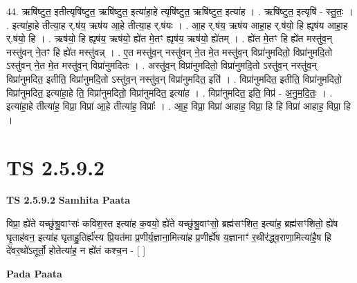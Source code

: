 \documentclass[17pt]{extarticle}
\begin{document}
44. ऋषि॑ष्टुत॒ इतीत्यृषि॑ष्टुत॒ ऋषि॑ष्टुत॒ इत्या॑हा॒हे त्यृषि॑ष्टुत॒ ऋषि॑ष्टुत॒ इत्या॑ह । . ऋषि॑ष्टुत॒ इत्यृषि॑ - स्तु॒तः॒ । . इत्या॑हा॒हे तीत्या॒ह र्.ष॑य॒ ऋष॑य आ॒हे तीत्या॒ह र्.ष॑यः । . आ॒ह र्.ष॑य॒ ऋष॑य आहा॒ह र्.ष॑यो॒ हि ह्यृष॑य आहा॒ह र्.ष॑यो॒ हि । . ऋष॑यो॒ हि ह्यृष॑य॒ ऋष॑यो॒ ह्ये॑त मे॒तꣳ ह्यृष॑य॒ ऋष॑यो॒ ह्ये॑तम् । . ह्ये॑त मे॒तꣳ हि ह्ये॑त मस्तु॑व॒न् नस्तु॑वन् ने॒तꣳ हि ह्ये॑त मस्तु॑वन्न् । . ए॒त मस्तु॑व॒न् नस्तु॑वन् ने॒त मे॒त मस्तु॑व॒न् विप्रा॑नुमदितो॒ विप्रा॑नुमदि॒तो ऽस्तु॑वन् ने॒त मे॒त मस्तु॑व॒न् विप्रा॑नुमदितः । . अस्तु॑व॒न् विप्रा॑नुमदितो॒ विप्रा॑नुमदि॒तो ऽस्तु॑व॒न् नस्तु॑व॒न् विप्रा॑नुमदित॒ इतीति॒ विप्रा॑नुमदि॒तो ऽस्तु॑व॒न् नस्तु॑व॒न् विप्रा॑नुमदित॒ इति॑ । . विप्रा॑नुमदित॒ इतीति॒ विप्रा॑नुमदितो॒ विप्रा॑नुमदित॒ इत्या॑हा॒हे ति॒ विप्रा॑नुमदितो॒ विप्रा॑नुमदित॒ इत्या॑ह । . विप्रा॑नुमदित॒ इति॒ विप्र॑ - अ॒नु॒म॒दि॒तः॒ । . इत्या॑हा॒हे तीत्या॑ह॒ विप्रा॒ विप्रा॑ आ॒हे तीत्या॑ह॒ विप्राः᳚ । . आ॒ह॒ विप्रा॒ विप्रा॑ आहाह॒ विप्रा॒ हि हि विप्रा॑ आहाह॒ विप्रा॒ हि । \newline
\pagebreak
{}
\section*{ TS 2.5.9.2 }

\textbf{TS 2.5.9.2 } \newline
\textbf{Samhita Paata} \newline

विप्रा॒ ह्ये॑ते यच्छु॑श्रु॒वाꣳसः॑ कविश॒स्त इत्या॑ह क॒वयो॒ ह्ये॑ते यच्छु॑श्रु॒वाꣳसो॒ ब्रह्म॑सꣳशित॒ इत्या॑ह॒ ब्रह्म॑सꣳशितो॒ ह्ये॑ष घृ॒ताह॑वन॒ इत्या॑ह घृताहु॒तिर्ह्य॑स्य प्रि॒यत॑मा प्र॒णीर्य॒ज्ञाना॒मित्या॑ह प्र॒णीर्ह्ये॑ष य॒ज्ञानाꣳ॑ र॒थीर॑द्ध्व॒राणा॒मित्या॑है॒ष हि दे॑वर॒थो॑ऽतूर्तो॒ होतेत्या॑ह॒ न ह्ये॑तं कश्च॒न - [  ] \newline

\textbf{Pada Paata} \newline
\end{document}
